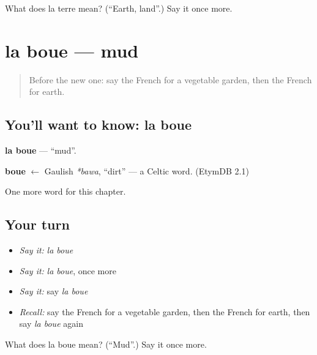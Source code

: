 \begin{tcolorbox}[breakable,colback=teal!4,colframe=teal!35!black,title={Before you move on}]
What does la terre mean? (\textquotedblleft{}Earth, land\textquotedblright{}.) Say it once more.
\end{tcolorbox}
\section[la boue]{la boue — mud}

\label{lesson:FR-C201-boue}



\begin{quote}
Before the new one: say the French for a vegetable garden, then the French for earth.
\end{quote}

\subsection*{You'll want to know: la boue}
\textbf{la boue} — \textquotedblleft{}mud\textquotedblright{}.

\begin{cousinweb}
\textbf{boue} $\leftarrow$ Gaulish \emph{*bawa}, \textquotedblleft{}dirt\textquotedblright{} — a Celtic word. (EtymDB 2.1)
\end{cousinweb}

\begin{grammarlens}[title={What you've built}]
One more word for this chapter.
\end{grammarlens}

\subsection*{Your turn}
\begin{itemize}
\raggedright
  \item \emph{Say it:} \emph{la boue}
  \item \emph{Say it:} \emph{la boue}, once more
  \item \emph{Say it:} say \emph{la boue}
  \item \emph{Recall:} say the French for a vegetable garden, then the French for earth, then say \emph{la boue} again
\end{itemize}

\begin{tcolorbox}[breakable,colback=teal!4,colframe=teal!35!black,title={Before you move on}]
What does la boue mean? (\textquotedblleft{}Mud\textquotedblright{}.) Say it once more.
\end{tcolorbox}
